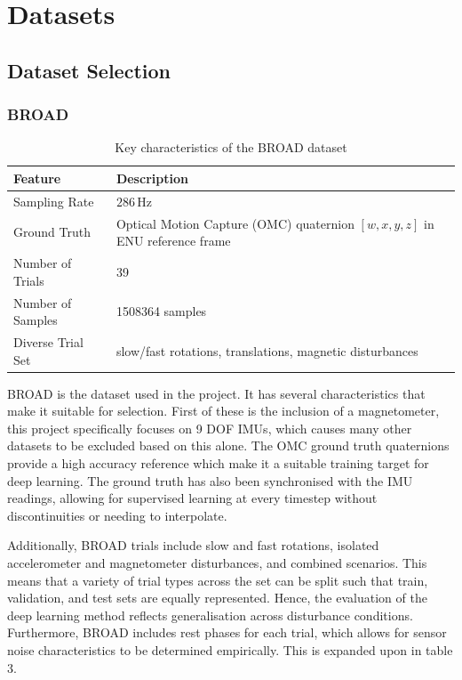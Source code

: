 \newpage
\section{Datasets}
\subsection{Dataset Selection}

\subsubsection{BROAD}
\begin{table}[!htbp]
\centering
\small
\begin{tabular}{p{3.5cm} p{8.5cm}}
\hline
\textbf{Feature} & \textbf{Description} \\
\hline

Sampling Rate & $286\,\text{Hz}$ \\
Ground Truth & Optical Motion Capture (OMC) quaternion $[w, x, y, z]$ in ENU reference frame \\
Number of Trials & 39 \\
Number of Samples & 1508364 samples \\
Diverse Trial Set & slow/fast rotations, translations, magnetic disturbances \\

\hline
\end{tabular}
\caption{Key characteristics of the BROAD dataset \cite{laidig_2021_broada}}
\label{tab:broad_dataset}
\end{table}




BROAD \cite{laidig_2021_broada} is the dataset used in the project. It has 
several characteristics that make it suitable for selection.
First of these is the inclusion of a magnetometer, this project specifically
focuses on 9 DOF IMUs, which causes many other datasets to be excluded based
on this alone. The OMC ground truth quaternions provide a high accuracy 
reference which make it a suitable training target for deep learning.
The ground truth has also been synchronised with the IMU readings, allowing
for supervised learning at every timestep without discontinuities or needing to 
interpolate.

Additionally, BROAD trials include slow and fast rotations, isolated 
accelerometer and magnetometer disturbances, and combined scenarios. 
This means that a variety of trial types across the set can be split such 
that train, validation, and test sets are equally represented. 
Hence, the evaluation of the deep learning
method reflects generalisation across disturbance conditions. Furthermore, BROAD includes
rest phases for each trial, which allows for sensor noise characteristics 
to be determined empirically. This is expanded upon in table 3.
  
